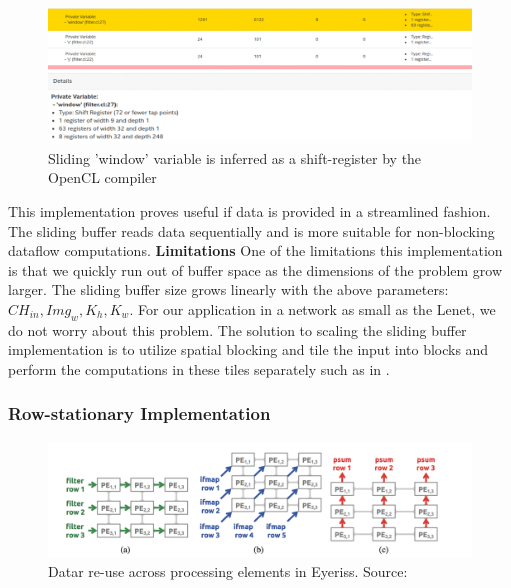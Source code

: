 \begin{figure}[h]
\centering
\includegraphics[width=1.0\textwidth]{Figures/shiftregister}
\decoRule
\caption[Shift Register]{ Sliding 'window' variable is inferred as a shift-register by the OpenCL compiler }
\label{fig:shiftregister}
\end{figure}

This implementation proves useful if data is provided in a streamlined fashion. The sliding buffer reads data sequentially and is more suitable for non-blocking dataflow computations.
\newline
\textbf{Limitations}
\newline
One of the limitations this implementation is that we quickly run out of buffer space as the dimensions of the problem grow larger. The sliding buffer size grows linearly with the above parameters: $ CH_{in}, Img_{w}, K_h, K_w $. For our application in a network as small as the Lenet, we do not worry about this problem. The solution to scaling the sliding buffer implementation is to utilize spatial blocking and tile the input into blocks and perform the computations in these tiles separately such as in \cite{2018combined}.

\subsubsection{Row-stationary Implementation} \label{rowimpl}

\begin{figure}[h]
\centering
\includegraphics[width=1.0\textwidth]{Figures/eyeriss}
\decoRule
\caption[Data Re-use in Eyeriss]{ Datar re-use across processing elements in Eyeriss. Source: \cite{eyeriss}}
\label{fig:eyeriss}
\end{figure}

